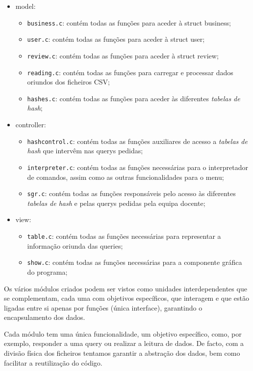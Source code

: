 \documentclass[a4paper]{article}
\begin{document}
\begin{itemize}
    \item model:
        \begin{itemize}
        \item \texttt{business.c}: contém todas as funções para aceder à struct business;
        \item \texttt{user.c}: contém todas as funções para aceder à struct user;
        \item \texttt{review.c}: contém todas as funções para aceder à struct review;
        \item \texttt{reading.c}: contém todas as funções para carregar e processar dados oriundos dos ficheiros CSV;
        \item \texttt{hashes.c}: contém todas as funções para aceder às diferentes \textit{tabelas de hash}; 
    \end{itemize}
    \item controller:
        \begin{itemize}
        \item \texttt{hashcontrol.c}: contém todas as funções auxiliares de acesso a \textit{tabelas de hash} que intervêm nas querys pedidas;
        \item \texttt{interpreter.c}: contém todas as funções necessárias para o interpretador de comandos, assim como as outras funcionalidades para o menu;
        \item \texttt{sgr.c}: contém todas as funções responsáveis pelo acesso às diferentes \textit{tabelas de hash} e pelas querys pedidas pela equipa docente;
    \end{itemize}
    \item view:
        \begin{itemize}
        \item \texttt{table.c}: contém todas as funções necessárias para representar a informação oriunda das queries;
        \item \texttt{show.c}: contém todas as funções necessárias para a componente gráfica do programa;
    \end{itemize}
\end{itemize}

Os vários módulos criados podem ser vistos como unidades interdependentes que se
complementam, cada uma com objetivos específicos, que interagem e que estão ligadas
entre si apenas por funções (única interface), garantindo o encapsulamento dos dados.

Cada módulo tem uma única funcionalidade, um objetivo específico,
como, por exemplo, responder a uma query ou realizar a leitura de dados.
De facto, com a divisão física dos ficheiros tentamos garantir a abstração dos dados, 
bem como facilitar a reutilização do código.
\end{document}
